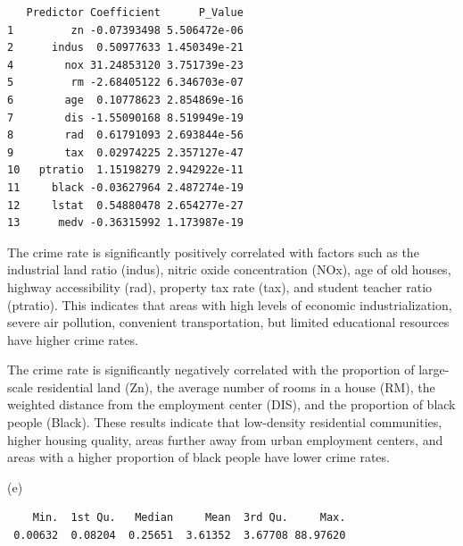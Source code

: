 \documentclass[
]{article}
\newenvironment{Shaded}{\begin{snugshade}}{\end{snugshade}}
\newcommand{\FunctionTok}[1]{\textcolor[rgb]{0.28,0.35,0.67}{#1}}
\newcommand{\NormalTok}[1]{\textcolor[rgb]{0.00,0.23,0.31}{#1}}
\newcommand{\SpecialCharTok}[1]{\textcolor[rgb]{0.37,0.37,0.37}{#1}}
\begin{document}
\begin{verbatim}
   Predictor Coefficient      P_Value
1         zn -0.07393498 5.506472e-06
2      indus  0.50977633 1.450349e-21
4        nox 31.24853120 3.751739e-23
5         rm -2.68405122 6.346703e-07
6        age  0.10778623 2.854869e-16
7        dis -1.55090168 8.519949e-19
8        rad  0.61791093 2.693844e-56
9        tax  0.02974225 2.357127e-47
10   ptratio  1.15198279 2.942922e-11
11     black -0.03627964 2.487274e-19
12     lstat  0.54880478 2.654277e-27
13      medv -0.36315992 1.173987e-19
\end{verbatim}

The crime rate is significantly positively correlated with factors such
as the industrial land ratio (indus), nitric oxide concentration (NOx),
age of old houses, highway accessibility (rad), property tax rate (tax),
and student teacher ratio (ptratio). This indicates that areas with high
levels of economic industrialization, severe air pollution, convenient
transportation, but limited educational resources have higher crime
rates.

The crime rate is significantly negatively correlated with the
proportion of large-scale residential land (Zn), the average number of
rooms in a house (RM), the weighted distance from the employment center
(DIS), and the proportion of black people (Black). These results
indicate that low-density residential communities, higher housing
quality, areas further away from urban employment centers, and areas
with a higher proportion of black people have lower crime rates.

(e)

\begin{Shaded}
\end{Shaded}

\begin{verbatim}
    Min.  1st Qu.   Median     Mean  3rd Qu.     Max. 
 0.00632  0.08204  0.25651  3.61352  3.67708 88.97620 
\end{verbatim}

\begin{Shaded}
\end{Shaded}
\end{document}
